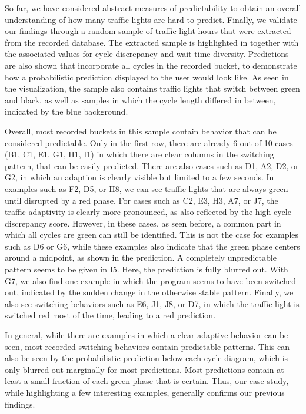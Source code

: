 So far, we have considered abstract measures of predictability to obtain an overall understanding of how many traffic lights are hard to predict. Finally, we validate our findings through a random sample of traffic light hours that were extracted from the recorded database. The extracted sample is highlighted in  together with the associated values for cycle discrepancy and wait time diversity. Predictions are also shown that incorporate all cycles in the recorded bucket, to demonstrate how a probabilistic prediction displayed to the user would look like. As seen in the visualization, the sample also contains traffic lights that switch between green and black, as well as samples in which the cycle length differed in between, indicated by the blue background.

Overall, most recorded buckets in this sample contain behavior that can be considered predictable. Only in the first row, there are already 6 out of 10 cases (B1, C1, E1, G1, H1, I1) in which there are clear columns in the switching pattern, that can be easily predicted. There are also cases such as D1, A2, D2, or G2, in which an adaption is clearly visible but limited to a few seconds. In examples such as F2, D5, or H8, we can see traffic lights that are always green until disrupted by a red phase. For cases such as C2, E3, H3, A7, or J7, the traffic adaptivity is clearly more pronounced, as also reflected by the high cycle discrepancy score. However, in these cases, as seen before, a common part in which all cycles are green can still be identified. This is not the case for examples such as D6 or G6, while these examples also indicate that the green phase centers around a midpoint, as shown in the prediction. A completely unpredictable pattern seems to be given in I5. Here, the prediction is fully blurred out. With G7, we also find one example in which the program seems to have been switched out, indicated by the sudden change in the otherwise stable pattern. Finally, we also see switching behaviors such as E6, J1, J8, or D7, in which the traffic light is switched red most of the time, leading to a red prediction.

In general, while there are examples in which a clear adaptive behavior can be seen, most recorded switching behaviors contain predictable patterns. This can also be seen by the probabilistic prediction below each cycle diagram, which is only blurred out marginally for most predictions. Most predictions contain at least a small fraction of each green phase that is certain. Thus, our case study, while highlighting a few interesting examples, generally confirms our previous findings.


